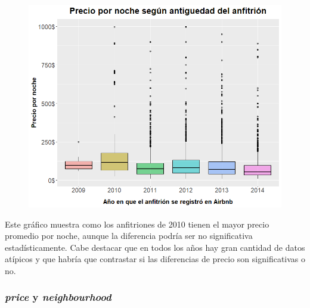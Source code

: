 \documentclass{article}
\begin{document}
\vspace{0.35cm}
\begin{figure}[h]
\hspace*{-0.15cm}
\centering
\includegraphics[scale = 0.6]{boxplot_precio_antiguedad}
\end{figure}
\vspace{0.15cm}

Este gráfico muestra como los anfitriones de 2010 tienen el mayor precio promedio por noche, aunque la diferencia podría ser no significativa estadísticamente. Cabe destacar que en todos los años hay gran cantidad de datos atípicos y que habría que contrastar si las diferencias de precio son significativas o no.

\clearpage
\subsubsection{\emph{price} y \emph{neighbourhood}}
\end{document}
